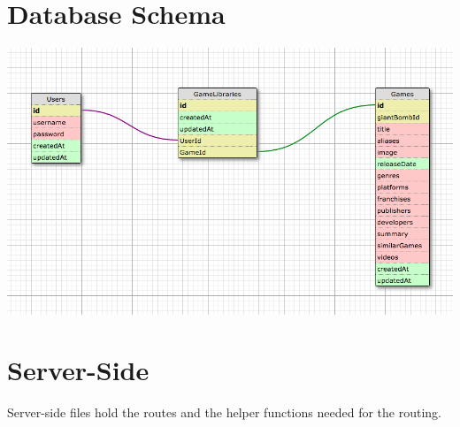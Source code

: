 \documentclass{article}
\begin{document}
\section{Database Schema}
\includegraphics[scale=.5]{Schemav4}

\section{Server-Side}
Server-side files hold the routes and the helper functions needed for the routing.
\end{document}
